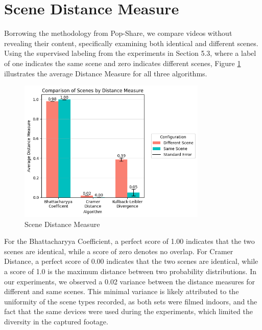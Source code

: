 \section{Scene Distance Measure}
Borrowing the methodology from Pop-Share, we compare videos without revealing their content, specifically examining both identical and different scenes. Using the supervised labeling from the experiments in Section 5.3, where a label of one indicates the same scene and zero indicates different scenes, Figure \ref{fig:scene-distance-measure} illustrates the average Distance Measure for all three algorithms. 

\begin{figure}[ht]
    \centering
    \includegraphics[width=0.8\textwidth]{5 Results/Figures/5.4 Bar Chart.png}
    \caption{Scene Distance Measure}
    \label{fig:scene-distance-measure}
\end{figure}

For the Bhattacharyya Coefficient, a perfect score of 1.00 indicates that the two scenes are identical, while a score of zero denotes no overlap. For Cramer Distance, a perfect score of 0.00 indicates that the two scenes are identical, while a score of 1.0 is the maximum distance between two probability distributions. In our experiments, we observed a 0.02 variance between the distance measures for different and same scenes. This minimal variance is likely attributed to the uniformity of the scene types recorded, as both sets were filmed indoors, and the fact that the same devices were used during the experiments, which limited the diversity in the captured footage.

